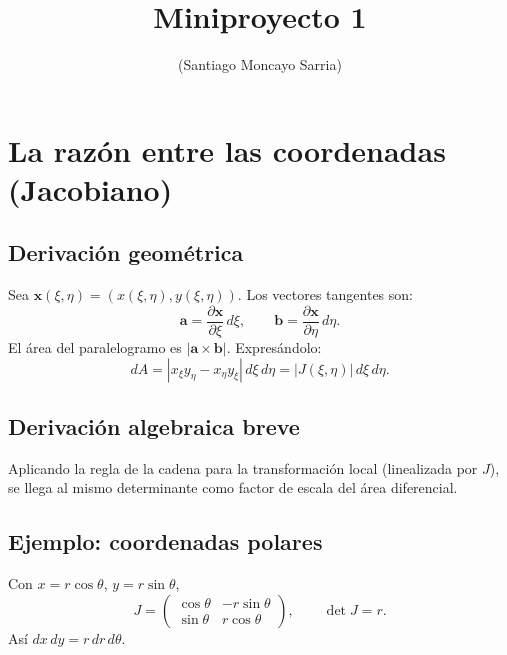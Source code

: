 \documentclass[a4paper,11pt]{article}
\title{Miniproyecto 1}
\author{(Santiago Moncayo Sarria)}
\date{}
\begin{document}
\maketitle
\section{La razón entre las coordenadas (Jacobiano)}

\subsection{Derivación geométrica}
Sea \(\mathbf{x}(\xi,\eta)=(x(\xi,\eta),y(\xi,\eta))\).
Los vectores tangentes son:
\[
\mathbf{a} = \frac{\partial\mathbf{x}}{\partial\xi}\, d\xi,
\qquad
\mathbf{b} = \frac{\partial\mathbf{x}}{\partial\eta}\, d\eta.
\]
El área del paralelogramo es \(|\mathbf{a}\times\mathbf{b}|\). Expresándolo:
\[
dA = |x_\xi y_\eta - x_\eta y_\xi|\, d\xi\, d\eta = |J(\xi,\eta)|\, d\xi\, d\eta.
\]

\subsection{Derivación algebraica breve}
Aplicando la regla de la cadena para la transformación local (linealizada por \(J\)), se llega al mismo determinante como factor de escala del área diferencial.

\subsection{Ejemplo: coordenadas polares}
Con \(x=r\cos\theta\), \(y=r\sin\theta\),
\[
J=\begin{pmatrix}\cos\theta & -r\sin\theta\\ \sin\theta & r\cos\theta\end{pmatrix},\qquad
\det J = r.
\]
Así \(dx\,dy = r\,dr\,d\theta\).
\end{document}
